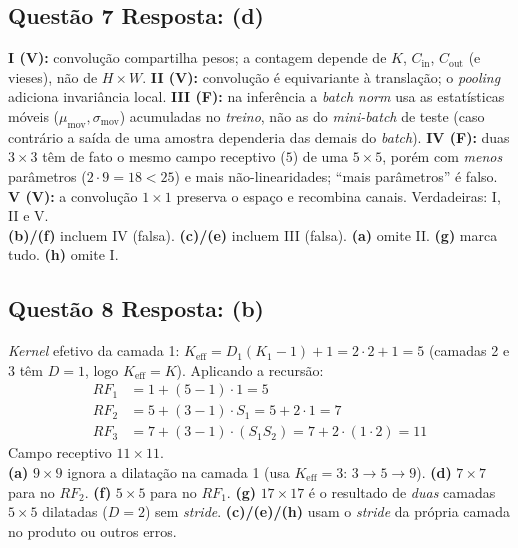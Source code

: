 \documentclass[11pt,a4paper]{article}
\begin{document}
\subsection*{Questão 7 \textemdash{} Resposta: (d)}
\textbf{I (V):} convolução compartilha pesos; a contagem depende de $K$, $C_{\text{in}}$, $C_{\text{out}}$ (e vieses), não de $H\times W$.
\textbf{II (V):} convolução é equivariante à translação; o \textit{pooling} adiciona invariância local.
\textbf{III (F):} na inferência a \textit{batch norm} usa as estatísticas móveis ($\mu_{\text{mov}}, \sigma_{\text{mov}}$) acumuladas no \emph{treino}, não as do \textit{mini-batch} de teste (caso contrário a saída de uma amostra dependeria das demais do \textit{batch}).
\textbf{IV (F):} duas $3\times 3$ têm de fato o mesmo campo receptivo ($5$) de uma $5\times 5$, porém com \emph{menos} parâmetros ($2\cdot 9 = 18 < 25$) e mais não-linearidades; ``mais parâmetros'' é falso.
\textbf{V (V):} a convolução $1\times 1$ preserva o espaço e recombina canais.
Verdadeiras: I, II e V.\\
\textbf{(b)/(f)} incluem IV (falsa).
\textbf{(c)/(e)} incluem III (falsa).
\textbf{(a)} omite II.
\textbf{(g)} marca tudo.
\textbf{(h)} omite I.

\subsection*{Questão 8 \textemdash{} Resposta: (b)}
\textit{Kernel} efetivo da camada 1: $K_{\text{eff}} = D_1(K_1 - 1) + 1 = 2\cdot 2 + 1 = 5$ (camadas 2 e 3 têm $D = 1$, logo $K_{\text{eff}} = K$). Aplicando a recursão:
\begin{align*}
    RF_1 &= 1 + (5 - 1)\cdot 1 = 5 \\
    RF_2 &= 5 + (3 - 1)\cdot S_1 = 5 + 2\cdot 1 = 7 \\
    RF_3 &= 7 + (3 - 1)\cdot (S_1 S_2) = 7 + 2\cdot(1\cdot 2) = 11
\end{align*}
Campo receptivo $11 \times 11$.\\
\textbf{(a)} $9 \times 9$ ignora a dilatação na camada 1 (usa $K_{\text{eff}} = 3$: $3 \to 5 \to 9$).
\textbf{(d)} $7 \times 7$ para no $RF_2$.
\textbf{(f)} $5 \times 5$ para no $RF_1$.
\textbf{(g)} $17 \times 17$ é o resultado de \emph{duas} camadas $5\times 5$ dilatadas ($D=2$) sem \textit{stride}.
\textbf{(c)/(e)/(h)} usam o \textit{stride} da própria camada no produto ou outros erros.

\end{document}
